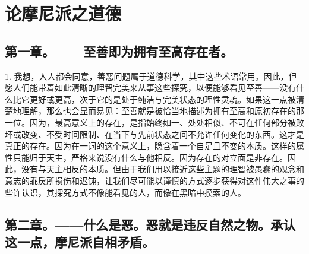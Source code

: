 
\chapter{论摩尼派之道德}


\par

\par


\section{第一章。——至善即为拥有至高存在者。}

1. 我想，人人都会同意，善恶问题属于道德科学，其中这些术语常用。因此，但愿人们能带着如此清晰的理智完美来从事这些探究，以便能够看见至善——没有什么比它更好或更高，次于它的是处于纯洁与完美状态的理性灵魂。如果这一点被清楚地理解，那么也会显而易见：至善就是被恰当地描述为拥有至高和原初存在的那一位。因为，最高意义上的存在，是指始终如一、处处相似、不可在任何部分被败坏或改变、不受时间限制、在当下与先前状态之间不允许任何变化的东西。这才是真正的存在。因为在一词的这个意义上，隐含着一个自足且不变的本质。这样的属性只能归于天主，严格来说没有什么与他相反。因为存在的对立面是非存在。因此，没有与天主相反的本质。但由于我们用以接近这些主题的理智被愚蠢的观念和意志的乖戾所损伤和迟钝，让我们尽可能以谨慎的方式逐步获得对这件伟大之事的些许认识，其探究方式不像能看见的人，而像在黑暗中摸索的人。\par


\section{第二章。——什么是恶。恶就是违反自然之物。承认这一点，摩尼派自相矛盾。}


